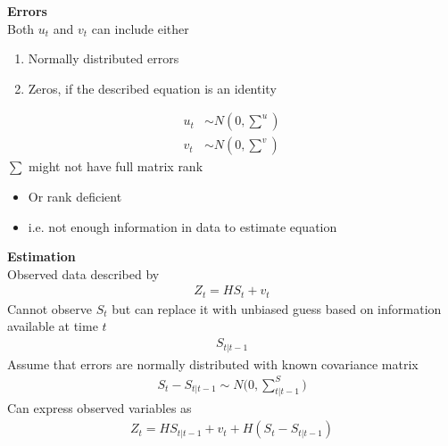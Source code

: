 \documentclass{beamer}
\begin{document}
\begin{frame}
  \textbf{Errors}\\ Both $u_t$ and $v_t$ can include either 
  \begin{enumerate}
    \item Normally distributed errors
    \item Zeros, if the described equation is an identity
  \end{enumerate}
  \begin{align}
    u_t &\sim N \left( 0,\scriptstyle \sum^u \right) \\
    v_t &\sim N \left( 0,\scriptstyle \sum^v \right)
  \end{align}
  \medskip
  $\sum$ might not have full matrix rank
  \begin{itemize}
    \item Or rank deficient
    \item i.e. not enough information in data to estimate equation
  \end{itemize}  
\end{frame}

\begin{frame}
  \textbf{Estimation}\\ Observed data described by
  \begin{align}
    Z_t = HS_t + v_t
  \end{align}
  Cannot observe $S_t$ but can replace it with unbiased guess based on information available at time $t$
  \begin{align}
    S_{t|t-1}
  \end{align}
  Assume that errors are normally distributed with known covariance matrix
  \begin{align}
    S_t-S_{t|t-1} \sim N (0,\scriptstyle \sum^S_{t|t-1} \textstyle)
  \end{align}
  Can express observed variables as
  \begin{align}
    Z_t=HS_{t|t-1}+v_t +H(S_t-S_{t|t-1})
  \end{align}
\end{frame}
\end{document}
